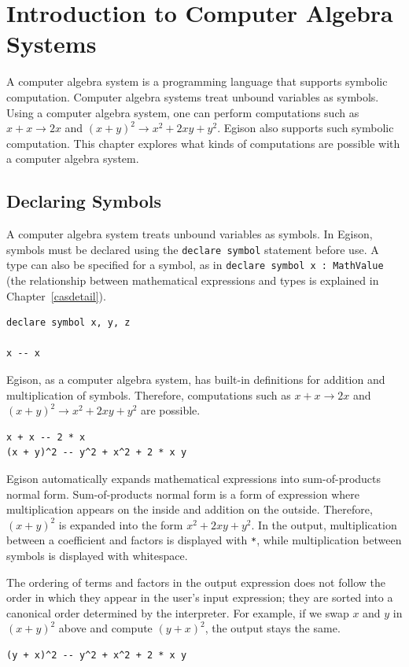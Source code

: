 \chapter{Introduction to Computer Algebra Systems}\label{cas}

A computer algebra system is a programming language that supports symbolic computation.
Computer algebra systems treat unbound variables as symbols.
Using a computer algebra system, one can perform computations such as $x + x \rightarrow 2x$ and $(x + y)^2 \rightarrow x^2 + 2 x y + y^2$.
Egison also supports such symbolic computation.
This chapter explores what kinds of computations are possible with a computer algebra system.

\section{Declaring Symbols}\label{cas-symbol}

A computer algebra system treats unbound variables as symbols.
In Egison, symbols must be declared using the \lstinline{declare symbol} statement before use.
A type can also be specified for a symbol, as in \lstinline{declare symbol x : MathValue} (the relationship between mathematical expressions and types is explained in Chapter~\ref{casdetail}).
\begin{lstlisting}[language=egison,numbers=none]
declare symbol x, y, z

x -- x
\end{lstlisting}

Egison, as a computer algebra system, has built-in definitions for addition and multiplication of symbols.
Therefore, computations such as $x + x \rightarrow 2x$ and $(x + y)^2 \rightarrow x^2 + 2 x y + y^2$ are possible.
\begin{lstlisting}[language=egison,numbers=none]
x + x -- 2 * x
(x + y)^2 -- y^2 + x^2 + 2 * x y
\end{lstlisting}

Egison automatically expands mathematical expressions into sum-of-products normal form.
Sum-of-products normal form is a form of expression where multiplication appears on the inside and addition on the outside.
Therefore, $(x + y)^2$ is expanded into the form $x^2 + 2 x y + y^2$.
In the output, multiplication between a coefficient and factors is displayed with \lstinline{*}, while multiplication between symbols is displayed with whitespace.

The ordering of terms and factors in the output expression does not follow the order in which they appear in the user's input expression; they are sorted into a canonical order determined by the interpreter.
For example, if we swap $x$ and $y$ in $(x + y)^2$ above and compute $(y + x)^2$, the output stays the same.
\begin{lstlisting}[language=egison,numbers=none]
(y + x)^2 -- y^2 + x^2 + 2 * x y
\end{lstlisting}

